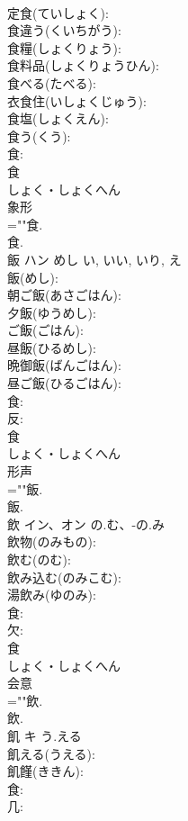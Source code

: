 \documentclass[8pt]{extreport}
\begin{document}
\begin{CJK}{UTF8}{min}
\\	定食(ていしょく): 
\\	食違う(くいちがう): 
\\	食糧(しょくりょう): 
\\	食料品(しょくりょうひん): 
\\	食べる(たべる): 
\\	衣食住(いしょくじゅう): 
\\	食塩(しょくえん): 
\\	食う(くう): 
\\	食: 
\\	食	
\\	しょく・しょくへん	
\\	象形 
\\	=""食.
\\	食.
\\	飯	ハン	めし	い, いい, いり, え	
\\	飯(めし): 
\\	朝ご飯(あさごはん): 
\\	夕飯(ゆうめし): 
\\	ご飯(ごはん): 
\\	昼飯(ひるめし): 
\\	晩御飯(ばんごはん): 
\\	昼ご飯(ひるごはん): 
\\	食: 
\\	反: 
\\	食	
\\	しょく・しょくへん	
\\	形声 
\\	=""飯.
\\	飯.
\\	飲	イン、オン	の.む、-の.み		
\\	飲物(のみもの): 
\\	飲む(のむ): 
\\	飲み込む(のみこむ): 
\\	湯飲み(ゆのみ): 
\\	食: 
\\	欠: 
\\	食	
\\	しょく・しょくへん	
\\	会意 
\\	=""飲.
\\	飲.
\\	飢	キ	う.える		
\\	飢える(うえる): 
\\	飢饉(ききん): 
\\	食: 
\\	几: 

\end{CJK}
\end{document}

